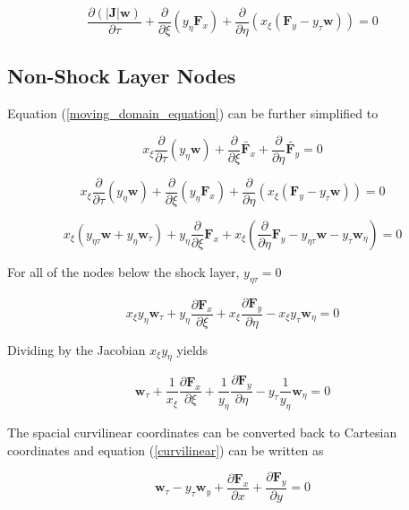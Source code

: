 \documentclass[10pt]{article}
\begin{document}
	 \begin{equation} \label{moving_domain_equation}
	 	\frac{\partial (|\mathbf{J}| \mathbf{w})}{\partial \tau} + \frac{\partial}{\partial \xi} (y_\eta \mathbf{F}_x) + \frac{\partial}{\partial \eta} (x_\xi (\mathbf{F}_y - y_\tau \mathbf{w})) = 0
	 \end{equation} 
	 
	 \subsection{Non-Shock Layer Nodes}
	 
	 Equation (\ref{moving_domain_equation}) can be further simplified to
	 
	 $$ x_\xi \frac{\partial}{\partial \tau} \left( y_\eta \mathbf{w} \right) + \frac{\partial}{\partial \xi} \tilde{\mathbf{F}_x} + \frac{\partial}{\partial \eta} \tilde{\mathbf{F}_y} = 0 $$
	 
	 $$ x_\xi \frac{\partial}{\partial \tau} \left( y_\eta \mathbf{w} \right) + \frac{\partial}{\partial \xi} (y_\eta \mathbf{F}_x) + \frac{\partial}{\partial \eta} (x_\xi (\mathbf{F}_y - y_\tau \mathbf{w})) = 0$$
	 
	 $$ x_\xi (y_{\eta \tau} \mathbf{w} + y_\eta \mathbf{w}_\tau) + y_\eta \frac{\partial}{\partial \xi} \mathbf{F}_x + x_\xi \left(\frac{\partial}{\partial \eta} \mathbf{F}_y - y_{\eta \tau} \mathbf{w} - y_\tau \mathbf{w}_\eta \right) = 0$$
	 
	 For all of the nodes below the shock layer, $y_{\eta \tau} = 0$
	 
	 $$ x_\xi y_\eta \mathbf{w}_\tau + y_\eta \frac{\partial \mathbf{F}_x}{\partial \xi} + x_\xi \frac{\partial \mathbf{F}_y}{\partial \eta} - x_\xi y_\tau \mathbf{w}_\eta = 0 $$
	 
	 Dividing by the Jacobian $x_\xi y_\eta$ yields
	 
	 $$ \mathbf{w}_\tau + \frac{1}{x_\xi} \frac{\partial \mathbf{F}_x}{\partial \xi} + \frac{1}{y_\eta} \frac{\partial \mathbf{F}_y}{\partial \eta} - y_\tau \frac{1}{y_\eta} \mathbf{w}_\eta = 0 $$
	 
	 The spacial curvilinear coordinates can be converted back to Cartesian coordinates and equation (\ref{curvilinear}) can be written as
	 
	 \begin{equation} \label{curvilinear2}
	 	\mathbf{w}_\tau  - y_\tau \mathbf{w}_y + \frac{\partial \mathbf{F}_x}{\partial x} + \frac{\partial \mathbf{F}_y}{\partial y} = 0
	 \end{equation}
	
\end{document}
